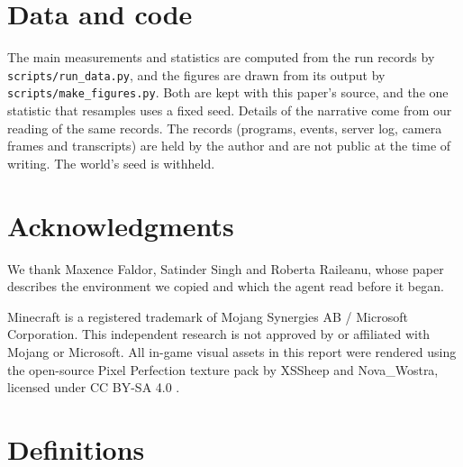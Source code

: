 \documentclass[11pt,a4paper]{article}
\begin{document}
\section*{Data and code}

The main measurements and statistics are computed from the run records by \texttt{scripts/run\_data.py}, and the figures are drawn from its output by \texttt{scripts/make\_figures.py}. Both are kept with this paper's source, and the one statistic that resamples uses a fixed seed. Details of the narrative come from our reading of the same records. The records (programs, events, server log, camera frames and transcripts) are held by the author and are not public at the time of writing. The world's seed is withheld.

\section*{Acknowledgments}

We thank Maxence Faldor, Satinder Singh and Roberta Raileanu, whose paper describes the environment we copied and which the agent read before it began.

Minecraft is a registered trademark of Mojang Synergies AB / Microsoft Corporation. This independent research is not approved by or affiliated with Mojang or Microsoft. All in-game visual assets in this report were rendered using the open-source Pixel Perfection texture pack by XSSheep and Nova\_Wostra, licensed under CC BY-SA 4.0 \citep{pixelperfection}.




\appendix
\section{Definitions}
\label{app:defs}
\end{document}
